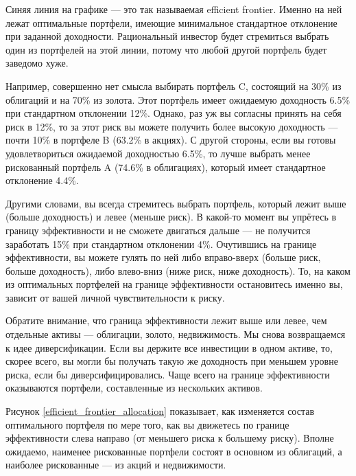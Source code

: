 Синяя линия на графике --- это так называемая 
{efficient frontier}. Именно на ней лежат оптимальные портфели, имеющие 
минимальное стандартное отклонение при заданной доходности. Рациональный 
инвестор будет стремиться выбрать один из портфелей на этой линии, потому что 
любой другой портфель будет заведомо хуже.

Например, совершенно нет смысла выбирать портфель C, состоящий на 30\% из 
облигаций и на 70\% из золота. Этот портфель имеет ожидаемую доходность 6.5\% 
при стандартном отклонении 12\%. Однако, раз уж вы согласны принять на себя риск 
в 12\%, то за этот риск вы можете получить более высокую доходность --- почти 
10\% в портфеле B (63.2\% в акциях). С другой стороны, если вы готовы 
удовлетвориться ожидаемой доходностью 6.5\%, то лучше выбрать менее рискованный 
портфель A (74.6\% в облигациях), который имеет стандартное отклонение 4.4\%.

Другими словами, вы всегда стремитесь выбрать портфель, который лежит выше 
(больше доходность) и левее (меньше риск). В какой-то момент вы упрётесь в 
границу эффективности и не сможете двигаться дальше --- не получится заработать 
15\% при стандартном отклонении 4\%. Очутившись на границе эффективности, вы 
можете гулять по ней либо вправо-вверх (больше риск, больше доходность), либо 
влево-вниз (ниже риск, ниже доходность). То, на каком из оптимальных портфелей 
на границе эффективности остановитесь именно вы, зависит от вашей личной 
чувствительности к риску.

Обратите внимание, что граница эффективности лежит выше или левее, чем отдельные 
активы --- облигации, золото, недвижимость. Мы снова возвращаемся к идее 
диверсификации. Если вы держите все инвестиции в одном активе, то, скорее всего, 
вы могли бы получать такую же доходность при меньшем уровне риска, если бы 
диверсифицировались. Чаще всего на границе эффективности оказываются портфели, 
составленные из нескольких активов.

Рисунок \ref{efficient_frontier_allocation} показывает, как изменяется состав 
оптимального портфеля по мере того, как вы движетесь по границе эффективности 
слева направо (от меньшего риска к большему риску). Вполне ожидаемо, наименее 
рискованные портфели состоят в основном из облигаций, а наиболее рискованные --- 
из акций и недвижимости.

